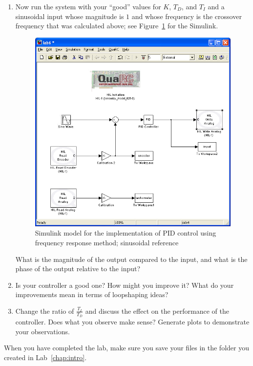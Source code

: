 \begin{enumerate}
\item Now run the system with your ``good'' values for $K$\@, $T_D$\@, and
$T_I$ and a sinusoidal input whose magnitude is $1$ and whose frequency is
the crossover frequency that was calculated above; see
Figure~\ref{fig:model9} for the \textsf{Simulink}\@.
\begin{figure}[htbp]
\centering
\includegraphics[width=0.6\hsize]{pix/lab9.jpg}
\caption{\textsf{Simulink} model for the implementation of PID control using
frequency response method; sinusoidal reference}\label{fig:model9}
\end{figure}%
What is the magnitude of the output compared to the input, and what is the
phase of the output relative to the input?

\item Is your controller a good one?  How might you improve it?  What do your
improvements mean in terms of loopshaping ideas?

\item Change the ratio of $\frac{T_{I}}{T_{D}}$ and discuss the effect on the
performance of the controller.  Does what you observe make sense?  Generate
plots to demonstrate your observations.
\end{enumerate}

When you have completed the lab, make sure you save your files in the folder
you created in Lab~\ref{chap:intro}\@.

